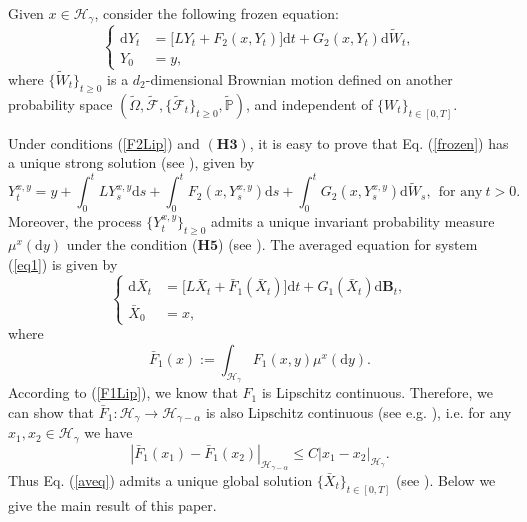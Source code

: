 \documentclass[10pt,a4paper]{article}
\numberwithin{equation}{section}
\begin{document}
Given $x \in \mathcal H_\gamma$, consider the following frozen equation:
 \begin{equation}\label{frozen}
	\left\{ \begin{aligned}
		\mathrm{d} Y_t&=\big[L Y_t+F_2(x,Y_t)\big] \mathrm{d} t+G_2(x,Y_t) \mathrm{d} \widetilde{W}_t,\\
		Y_0&= y,
	\end{aligned} \right.
\end{equation}
where $\{\widetilde{W}_t\}_{t\geq0}$ is a $d_2$-dimensional Brownian motion defined on another probability space $(\widetilde{\Omega} ,\widetilde{\mathcal F},\{\widetilde{\mathcal F}_t\}_{t\geq0},\widetilde{\mathbb P})$, and independent of $\{W_t\}_{t \in [0,T]}$.



Under conditions (\ref{F2Lip}) and $(\mathbf{H3})$, it is easy to prove that Eq. (\ref{frozen}) has a unique strong solution (see \cite{DF10}), given by
\begin{equation*}
 Y_t^{x,y}=y + \int_0^t L Y_s^{x,y} \mathrm{d} s +\int_0^t F_2(x, Y_s^{x,y}) \mathrm{d}s+ \int_0^t G_2(x, Y_s^{x,y}) \mathrm{d} \widetilde{W}_s, ~~\text{for any}~t >0.
 \end{equation*}
Moreover, the process $\{Y_t^{x,y}\}_{t \geq 0}$ admits a unique invariant probability measure $\mu^x (\mathrm{d} y)$ under the condition ($\mathbf{H5}$) (see \cite[Theorem 2.2]{HLL20}).
The averaged equation for system (\ref{eq1}) is given by
\begin{equation}\label{aveq}
	\left\{ \begin{aligned}
		\mathrm{d} \bar{X}_t&=\big[ L \bar{X}_t+\bar{F}_1 (\bar{X}_t)\big] \mathrm{d} t+G_1(\bar{X}_t)\mathrm{d} \mathbf B_t,\\
		\bar{X}_0&=x,
	\end{aligned} \right.
\end{equation}
where
$$\bar{F}_1 (x):=\displaystyle \int_{\mathcal{H}_\gamma} F_1 (x,y) \mu^x (\mathrm{d} y).$$
According to (\ref{F1Lip}), we know that $F_1$ is Lipschitz continuous. Therefore, we can show that $\bar{F}_1:\mathcal{H}_\gamma \to \mathcal{H}_{\gamma-\alpha}$ is also Lipschitz continuous (see e.g. \cite[Remark 4.1]{LLPX25}), i.e. for any $x_1,x_2 \in \mathcal H_\gamma$ we have
\begin{equation}\label{Fbar}
	|\bar{F}_1(x_1)-\bar{F}_1(x_2)|_{\mathcal H_{\gamma-\alpha}} \leq C |x_1-x_2|_{\mathcal H_\gamma}.
\end{equation}
Thus Eq. (\ref{aveq}) admits a unique global solution $\{\bar{X}_t\}_{t \in [0,T]}$ (see \cite[Theorem 3.2]{HN22}).
Below we give the main result of this paper.
\end{document}
